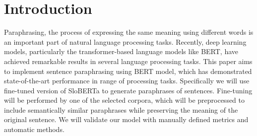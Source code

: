 \documentclass[fleqn,moreauthors,10pt]{ds_report}
\affiliation{\textit{Advisors: Slavko Žitnik}}
\begin{document}
\flushbottom 

\maketitle 

\thispagestyle{empty} 


\section*{Introduction}
	
Paraphrasing, the process of expressing the same meaning using different words is an important part of natural language processing tasks. Recently, deep learning models, particularly the transformer-based language models like BERT, have achieved remarkable results in several language processing tasks. This paper aims to implement sentence paraphrasing using BERT model, which has demonstrated state-of-the-art performance in range of processing tasks. Specifically we will use fine-tuned version of SloBERTa \cite{11356/1387} to generate paraphrases of sentences. Fine-tuning will be performed by one of the selected corpora, which will be preprocessed to include semantically similar paraphrases while preserving the meaning of the original sentence. We will validate our model with manually defined metrics and automatic methods. 
\end{document}
